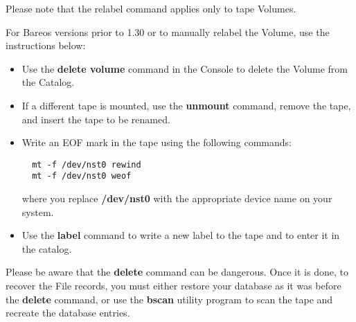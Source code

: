 Please note that the relabel command applies only to tape Volumes.

For Bareos versions prior to 1.30 or to manually relabel the Volume, use the
instructions below:

\begin{itemize}
\item Use the {\bf delete volume} command in the Console  to delete the Volume
   from the Catalog.
\item If a different tape is mounted, use the {\bf unmount}  command,
   remove the tape, and insert the tape to be  renamed.
\item Write an EOF mark in the tape using the following  commands:

\footnotesize
\begin{verbatim}
  mt -f /dev/nst0 rewind
  mt -f /dev/nst0 weof
\end{verbatim}
\normalsize

where you replace {\bf /dev/nst0} with the appropriate  device name on your
system.
\item Use the {\bf label} command to write a new label to  the tape and to
   enter it in the catalog.
\end{itemize}

Please be aware that the {\bf delete} command can be dangerous. Once it is
done, to recover the File records, you must either restore your database as it
was before the {\bf delete} command, or use the {\bf bscan} utility program to
scan the tape and recreate the database entries.

